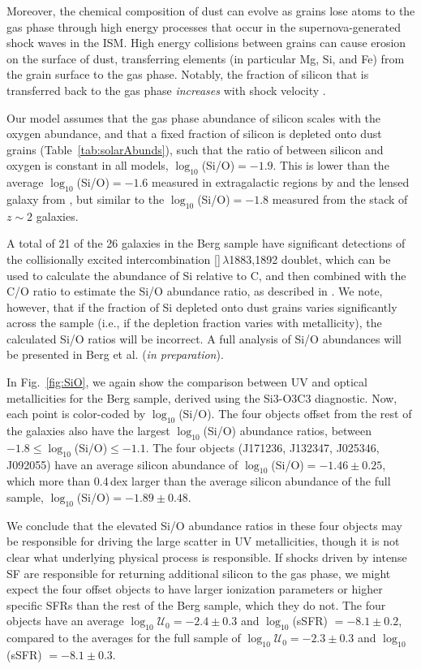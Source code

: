 \documentclass[trackchanges, preprint2]{aastex62}
\newcommand{\hii}{\ion{H}{2}}
\newcommand{\SiuIII}{[\ion{Si}{3}]}
\newcommand{\logten}{\ensuremath{\log_{10}}}
\newcommand{\logUeq}[1]{\ensuremath{\logten \mathcal{U}_0 = #1}}
\begin{document}
Moreover, the chemical composition of dust can evolve as grains lose atoms to the gas phase through high energy processes that occur in the supernova-generated shock waves in the ISM. High energy collisions between grains can cause erosion on the surface of dust, transferring elements (in particular Mg, Si, and Fe) from the grain surface to the gas phase. Notably, the fraction of silicon that is transferred back to the gas phase \emph{increases} with shock velocity \citep[see review on depletion patterns and dust evolution in][]{Jones+2000}.

Our model assumes that the gas phase abundance of silicon scales with the oxygen abundance, and that a fixed fraction of silicon is depleted onto dust grains (Table~\ref{tab:solarAbunds}), such that the ratio of between silicon and oxygen is constant in all models, $\log_{10}$(Si/O)$=-1.9$. This is lower than the average $\log_{10}$(Si/O)$=-1.6$ measured in extragalactic \hii{} regions by \citet{Garnett+1995} and the lensed galaxy from \citet{Berg+2018}, but similar to the $\log_{10}$(Si/O)$=-1.8$ measured from the \citet{Steidel+2016} stack of $z\sim2$ galaxies.

A total of 21 of the 26 galaxies in the Berg sample have significant detections of the collisionally excited intercombination \SiuIII$\,\lambda$1883,1892 doublet, which can be used to calculate the abundance of Si relative to C, and then combined with the C/O ratio to estimate the Si/O abundance ratio, as described in \citet{Berg+2018}. We note, however, that if the fraction of Si depleted onto dust grains varies significantly across the sample (i.e., if the depletion fraction varies with metallicity), the calculated Si/O ratios will be incorrect. A full analysis of Si/O abundances will be presented in Berg et al. (\emph{in preparation}).

In Fig.~\ref{fig:SiO}, we again show the comparison between UV and optical metallicities for the Berg sample, derived using the Si3-O3C3 diagnostic. Now, each point is color-coded by $\log_{10}$(Si/O). The four objects offset from the rest of the \citet{Berg+2016} galaxies also have the largest $\log_{10}$(Si/O) abundance ratios, between $-1.8 \leq \log_{10}$(Si/O)$ \leq-1.1$. The four objects (J171236, J132347, J025346, J092055) have an average silicon abundance of $\log_{10}$(Si/O)$=-1.46\pm0.25$, which more than 0.4\,dex larger than the average silicon abundance of the full sample, $\log_{10}$(Si/O)$=-1.89\pm0.48$.

We conclude that the elevated Si/O abundance ratios in these four objects may be responsible for driving the large scatter in UV metallicities, though it is not clear what underlying physical process is responsible. If shocks driven by intense SF are responsible for returning additional silicon to the gas phase, we might expect the four offset objects to have larger ionization parameters or higher specific SFRs than the rest of the Berg sample, which they do not. The four objects have an average $\logUeq{-2.4} \pm 0.3$ and \logten(sSFR) $=-8.1 \pm 0.2$, compared to the averages for the full sample of $\logUeq{-2.3} \pm 0.3$ and \logten(sSFR) $=-8.1 \pm 0.3$.
\end{document}
